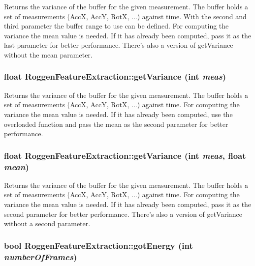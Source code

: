 \label{classRoggenFeatureExtraction_a6d66fc557929d6be589640e4f2325991}
Returns the variance of the buffer for the given measurement. The buffer holds a set of measurements (AccX, AccY, RotX, ...) against time. With the second and third parameter the buffer range to use can be defined. For computing the variance the mean value is needed. If it has already been computed, pass it as the last parameter for better performance. There's also a version of getVariance without the mean parameter. \hypertarget{classRoggenFeatureExtraction_af0aab8ee3b82d4d4e7f72901c87030e4}{
\subsubsection[{getVariance}]{\setlength{\rightskip}{0pt plus 5cm}float RoggenFeatureExtraction::getVariance (int {\em meas})}}
\label{classRoggenFeatureExtraction_af0aab8ee3b82d4d4e7f72901c87030e4}
Returns the variance of the buffer for the given measurement. The buffer holds a set of measurements (AccX, AccY, RotX, ...) against time. For computing the variance the mean value is needed. If it has already been computed, use the overloaded function and pass the mean as the second parameter for better performance. \hypertarget{classRoggenFeatureExtraction_af62cc552f9056669645aa1e14f05843d}{
\subsubsection[{getVariance}]{\setlength{\rightskip}{0pt plus 5cm}float RoggenFeatureExtraction::getVariance (int {\em meas}, \/  float {\em mean})}}
\label{classRoggenFeatureExtraction_af62cc552f9056669645aa1e14f05843d}
Returns the variance of the buffer for the given measurement. The buffer holds a set of measurements (AccX, AccY, RotX, ...) against time. For computing the variance the mean value is needed. If it has already been computed, pass it as the second parameter for better performance. There's also a version of getVariance without a second parameter. \hypertarget{classRoggenFeatureExtraction_ae1028692308f074789b65831af17fc7c}{
\subsubsection[{gotEnergy}]{\setlength{\rightskip}{0pt plus 5cm}bool RoggenFeatureExtraction::gotEnergy (int {\em numberOfFrames})}}
